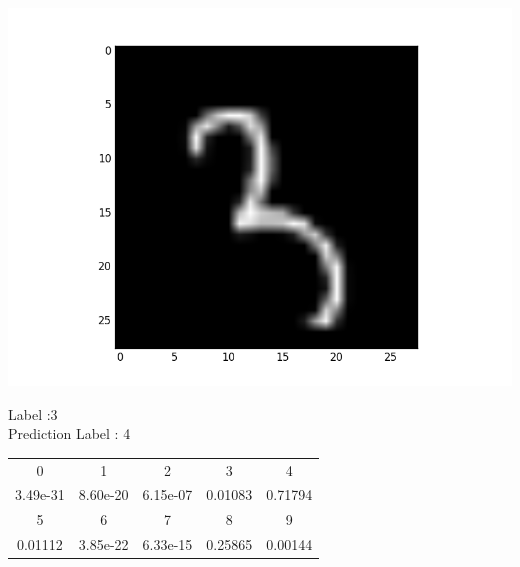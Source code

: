 \documentclass{article}
\begin{document}
\noindent\begin{minipage}{0.5\textwidth}
	\includegraphics[width=\linewidth]{hw3_f5}
\end{minipage}%
\hfill%
\begin{minipage}{0.5\textwidth}
	Label :3\\
	Prediction Label : 4\\
	\begin{tabular}{ | c | c | c | c | c | }
		\hline
		0 & 1 & 2 & 3 & 4 \\		
3.49e-31 &
8.60e-20 &
6.15e-07 &
0.01083 &
0.71794\\
		\hline
		5 & 6 & 7 & 8 & 9 \\
0.01112 &
3.85e-22 &
6.33e-15 &
0.25865 &
0.00144 \\
		\hline
	\end{tabular}\\
\end{minipage}
\end{document}
